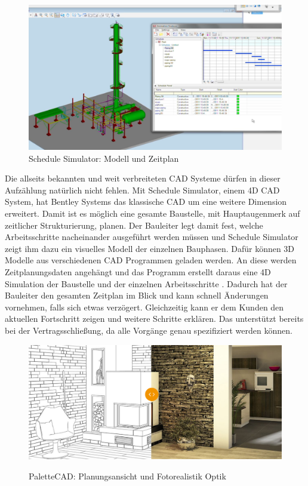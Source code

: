 \begin{figure}[h]
	\begin{center}
		\noindent\includegraphics[scale=0.4]{Resources/Hintergrund/schedule4D.png}
		\caption{Schedule Simulator: Modell und Zeitplan}	
	\end{center}
\end{figure}

Die allseits bekannten und weit verbreiteten CAD Systeme dürfen in dieser Aufzählung natürlich nicht fehlen. Mit Schedule Simulator, einem 4D CAD System, hat Bentley Systems das klassische CAD um eine weitere Dimension erweitert. Damit ist es möglich eine gesamte Baustelle, mit Hauptaugenmerk auf zeitlicher Strukturierung, planen. Der Bauleiter legt damit fest, welche Arbeitsschritte nacheinander ausgeführt werden müssen und Schedule Simulator zeigt ihm dazu ein visuelles Modell der einzelnen Bauphasen. Dafür können 3D Modelle aus verschiedenen CAD Programmen geladen werden. An diese werden Zeitplanungsdaten angehängt und das Programm erstellt daraus eine 4D Simulation der Baustelle und der einzelnen Arbeitsschritte \cite{heesom_trends_2004}. Dadurch hat der Bauleiter den gesamten Zeitplan im Blick und kann schnell Änderungen vornehmen, falls sich etwas verzögert. Gleichzeitig kann er dem Kunden den aktuellen Fortschritt zeigen und weitere Schritte erklären. Das unterstützt bereits bei der Vertragsschließung, da alle Vorgänge genau spezifiziert werden können.

\begin{figure}[h]
	\begin{center}
		\noindent\includegraphics[scale=0.4]{Resources/Hintergrund/paletteSlider.png}
		\label{fotoreal}
		\caption{PaletteCAD: Planungsansicht und Fotorealistik Optik}	
	\end{center}
\end{figure}

